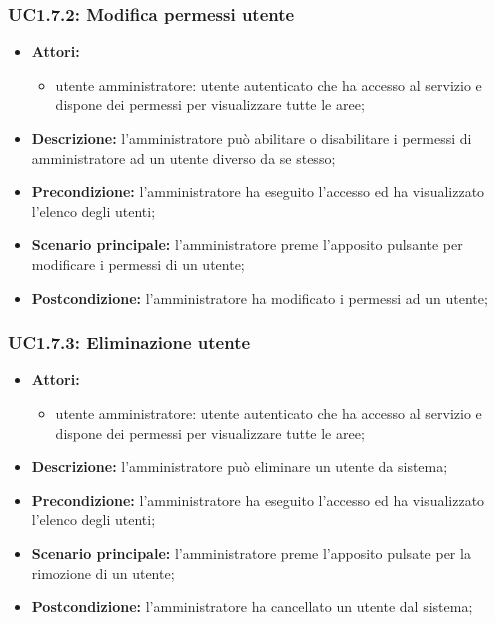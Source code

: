 \subsubsection{UC1.7.2: Modifica permessi utente}
\begin{itemize}
	\item \textbf{Attori:}
	\begin{itemize}
		\item utente amministratore: utente autenticato che ha accesso al servizio e dispone dei permessi per visualizzare tutte le aree;
	\end{itemize}
	\item \textbf{Descrizione:} l'amministratore può abilitare o disabilitare i permessi di amministratore ad un utente diverso da se stesso;
	\item \textbf{Precondizione:} l'amministratore ha eseguito l'accesso ed ha visualizzato l'elenco degli utenti;
	\item \textbf{Scenario principale:} l'amministratore preme l'apposito pulsante per modificare i permessi di un utente;
	\item \textbf{Postcondizione:} l'amministratore ha modificato i permessi ad un utente;
\end{itemize}

\subsubsection{UC1.7.3: Eliminazione utente}
\begin{itemize}
	\item \textbf{Attori:}
	\begin{itemize}
		\item utente amministratore: utente autenticato che ha accesso al servizio e dispone dei permessi per visualizzare tutte le aree;
	\end{itemize}
	\item \textbf{Descrizione:} l'amministratore può eliminare un utente da sistema;
	\item \textbf{Precondizione:} l'amministratore ha eseguito l'accesso ed ha visualizzato l'elenco degli utenti;
	\item \textbf{Scenario principale:} l'amministratore preme l'apposito pulsate per la rimozione di un utente;
	\item \textbf{Postcondizione:} l'amministratore ha cancellato un utente dal sistema;
\end{itemize}

